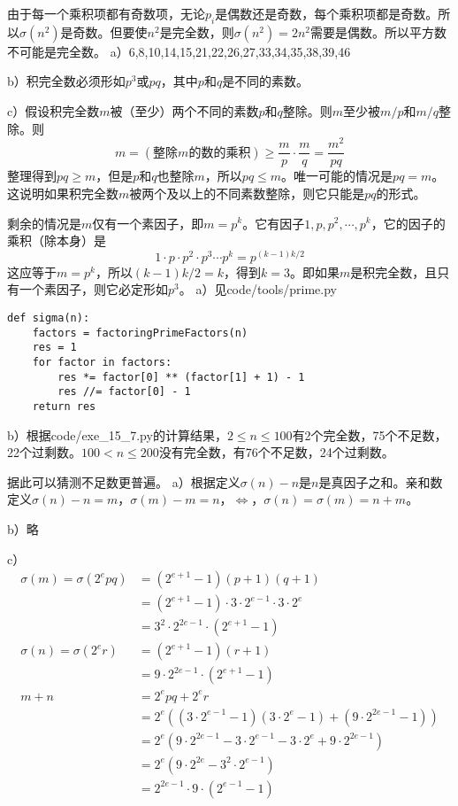 由于每一个乘积项都有奇数项，无论$p_i$是偶数还是奇数，每个乘积项都是奇数。所以$\sigma(n^2)$是奇数。但要使$n^2$是完全数，则$\sigma(n^2)=2n^2$需要是偶数。所以平方数不可能是完全数。
%
\exercise a）6,8,10,14,15,21,22,26,27,33,34,35,38,39,46\par
b）积完全数必须形如$p^3$或$pq$，其中$p$和$q$是不同的素数。\par
c）\proof 假设积完全数$m$被（至少）两个不同的素数$p$和$q$整除。则$m$至少被$m/p$和$m/q$整除。则
\[m=(\text{整除$m$的数的乘积})\ge\frac{m}{p}\cdot\frac{m}{q}=\frac{m^2}{pq}\]
整理得到$pq\ge m$，但是$p$和$q$也整除$m$，所以$pq\le m$。唯一可能的情况是$pq=m$。这说明如果积完全数$m$被两个及以上的不同素数整除，则它只能是$pq$的形式。\par
剩余的情况是$m$仅有一个素因子，即$m=p^k$。它有因子$1,p,p^2,\cdots,p^k$，它的因子的乘积（除本身）是
\[1\cdot p\cdot p^2\cdot p^3\cdots p^k=p^{(k-1)k/2}\]
这应等于$m=p^k$，所以$(k-1)k/2=k$，得到$k=3$。即如果$m$是积完全数，且只有一个素因子，则它必定形如$p^3$。
%
\exercise a）见code/tools/prime.py
\begin{lstlisting}
def sigma(n):
    factors = factoringPrimeFactors(n)
    res = 1
    for factor in factors:
        res *= factor[0] ** (factor[1] + 1) - 1
        res //= factor[0] - 1
    return res
\end{lstlisting}
b）根据code/exe\_15\_7.py的计算结果，$2\le n\le100$有2个完全数，75个不足数，22个过剩数。$100<n\le200$没有完全数，有76个不足数，24个过剩数。\par
据此可以猜测不足数更普遍。
%
\exercise a）\proof 根据定义$\sigma(n)-n$是$n$是真因子之和。亲和数定义$\sigma(n)-n=m$，$\sigma(m)-m=n$，$\Leftrightarrow$，$\sigma(n)=\sigma(m)=n+m$。\par
b）略\par
c）\proof 
\begin{align*}
\sigma(m)=\sigma(2^epq)&=(2^{e+1}-1)(p+1)(q+1) \\
&=(2^{e+1}-1)\cdot3\cdot2^{e-1}\cdot3\cdot2^e \\
&=3^2\cdot2^{2e-1}\cdot(2^{e+1}-1) \\
\sigma(n)=\sigma(2^er)&=(2^{e+1}-1)(r+1) \\
&=9\cdot2^{2e-1}\cdot(2^{e+1}-1) \\
m+n&=2^epq+2^er \\
&=2^e\left((3\cdot2^{e-1}-1)(3\cdot2^e-1)+(9\cdot2^{2e-1}-1)\right)\\
&=2^e(9\cdot2^{2e-1}-3\cdot2^{e-1}-3\cdot2^e+9\cdot2^{2e-1}) \\
&=2^e(9\cdot2^{2e}-3^2\cdot2^{e-1}) \\
&=2^{2e-1}\cdot9\cdot(2^{e-1}-1)\\
\end{align*}
